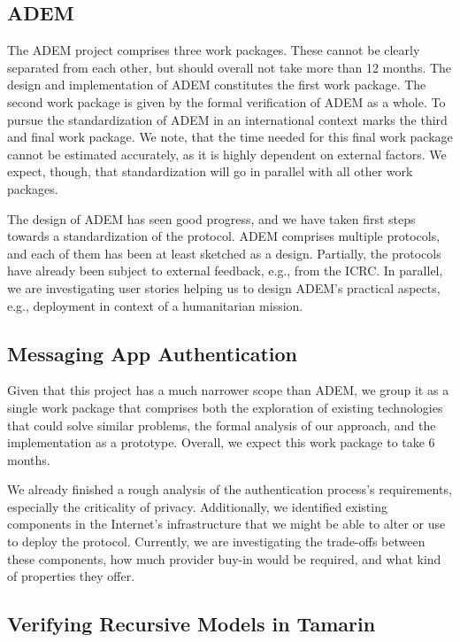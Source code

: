 \documentclass{article}
\begin{document}
\subsection{\gls{ADEM}}

The \gls{ADEM} project comprises three work packages.
These cannot be clearly separated from each other, but should overall not take more than 12 months.
The design and implementation of \gls{ADEM} constitutes the first work package.
The second work package is given by the formal verification of \gls{ADEM} as a whole.
To pursue the standardization of \gls{ADEM} in an international context marks the third and final work package.
We note, that the time needed for this final work package cannot be estimated accurately, as it is highly dependent on external factors.
We expect, though, that standardization will go in parallel with all other work packages.

The design of \gls{ADEM} has seen good progress, and we have taken first steps towards a standardization of the protocol.
\Gls{ADEM} comprises multiple protocols, and each of them has been at least sketched as a design.
Partially, the protocols have already been subject to external feedback, e.g., from the \gls{ICRC}.
In parallel, we are investigating user stories helping us to design \gls{ADEM}'s practical aspects, e.g., deployment in context of a humanitarian mission.

\subsection{Messaging App Authentication}

Given that this project has a much narrower scope than \gls{ADEM}, we group it as a single work package that comprises both the exploration of existing technologies that could solve similar problems, the formal analysis of our approach, and the implementation as a prototype.
Overall, we expect this work package to take 6 months.

We already finished a rough analysis of the authentication process's requirements, especially the criticality of privacy.
Additionally, we identified existing components in the Internet's infrastructure that we might be able to alter or use to deploy the protocol.
Currently, we are investigating the trade-offs between these components, how much provider buy-in would be required, and what kind of properties they offer.

\subsection{Verifying Recursive Models in Tamarin}
\end{document}
